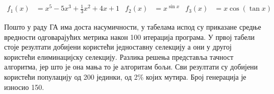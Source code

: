 \documentclass{article}
\begin{document}
\begin{align*}
    f_1(x) &= x^5 - 5x^3 + \frac{1}{3} x^2 + 4x + 1 & f_2(x) &= x ^ {\sin x} & f_3(x) &= x \cos(\tan x)
\end{align*}

\begin{center}
    \begin{minipage}{0.3\linewidth}
    \end{minipage}
    \begin{minipage}{0.3\linewidth}
    \end{minipage}
    \begin{minipage}{0.3\linewidth}
    \end{minipage}
    
\end{center}

\noindent Пошто у раду ГА има доста насумичности, у табелама испод су приказане средње вредности одговарајућих
метрика након 100 итерација програма. У првој табели стоје резултати добијени користећи
једноставну селекцију а они у другој користећи елиминацијску селекцију. Разлика решења представља 
тачност алгоритма, јер што је она мања то је алгоритам бољи. Сви резултати су добијени користећи 
популацију од 200 јединки, од 2\% којих мутира. Број генерација је износио 150.
\end{document}
